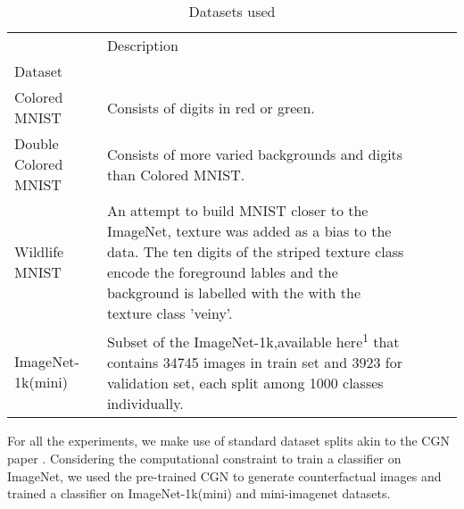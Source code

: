 \fi


\begin{table}[h]
\centering

\begin{tabularx}{\textwidth}{lXXXX}
\toprule
{} & Description\\
Dataset&\\
\midrule
Colored MNIST & Consists of digits in red or green.  \\ 
Double Colored MNIST & Consists of more varied backgrounds and digits than Colored MNIST.  \\
Wildlife MNIST & An attempt to build MNIST \cite{lecun1998gradient} closer to the ImageNet\cite{deng2009imagenet}, texture was added as a bias to the data. The ten digits of the striped texture class encode the foreground lables and the background is labelled with the with the texture class 'veiny'.  \\
ImageNet-1k(mini) & Subset of the ImageNet-1k\cite{ImageNet-1k},available here\textsuperscript{1} that contains 34745 images in train set and 3923 for validation set, each split among 1000 classes individually.
\label{table:imagenet_ood}
\end{tabularx}
\caption{Datasets used}
\end{table}
For all the experiments, we make use of standard dataset splits akin to the CGN paper \cite{sauer2021counterfactual}. Considering the computational constraint to train a classifier on ImageNet\cite{imagenet}, we used the pre-trained CGN to generate counterfactual images and trained a classifier on ImageNet-1k(mini) and mini-imagenet datasets.





